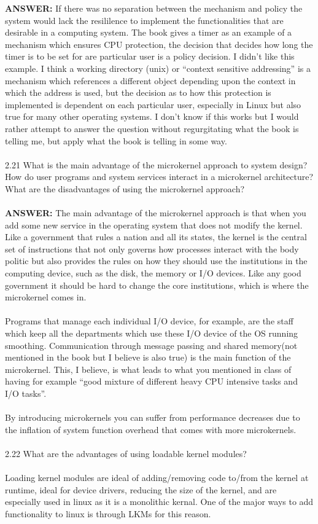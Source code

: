 \documentclass[12pt]{article}
\begin{document}
\textbf{ANSWER: }If there was no separation between the mechanism 
and policy the system would lack the resililence to implement the 
functionalities that are desirable in a computing system. The book 
gives a timer as an example of a mechanism which ensures CPU 
protection, the decision that decides how long the timer is 
to be set for are particular user is a policy decision. I didn't 
like this example. I think a working directory (unix) or ``context 
sensitive addressing'' is a mechanism which references a 
different object depending upon the context in which the 
address is used, but the decision as to how this protection 
is implemented is dependent on each particular user, especially in 
Linux but also true for many other operating systems. I don't know 
if this works but I would rather attempt to answer the question without 
regurgitating what the book is telling me, but apply what the 
book is telling in some way.
\\\\2.21 What is the main advantage of the microkernel approach to system
design? How do user programs and system services interact in a
microkernel architecture? What are the disadvantages of using the
microkernel approach?\\\\
\textbf{ANSWER: }The main advantage of the microkernel approach 
is that when you add some new service in the operating system that 
does not modify the kernel. Like a government that rules a nation 
and all its states, the kernel is the central set of instructions 
that not only governs how processes interact with the body politic 
but also provides the rules on how they should use the institutions 
in the computing device, such as the disk, the memory or I/O devices.
Like any good government it should be hard to change the core 
institutions, which is where the microkernel comes in.\\\\
Programs that manage each individual I/O device, for example, 
are the staff which keep all the departments which use these I/O 
device of the OS running smoothing. Communication through message 
passing and shared memory(not mentioned in the book but I believe 
is also true) is the main function of the microkernel. This, I believe, 
is what leads to what you mentioned in class of having for example
 ``good mixture of different heavy CPU intensive tasks 
and I/O tasks''.\\\\
By introducing microkernels you can suffer from performance decreases 
due to the inflation of system function overhead that comes with 
more microkernels.\\\\
2.22 What are the advantages of using loadable kernel modules?\\\\
Loading kernel modules are ideal of adding/removing code to/from 
the kernel at runtime, ideal for device drivers, reducing the size of 
the kernel, and are especially used in linux as it is a monolithic kernal.
One of the major ways to add functionality to linux is through LKMs for 
this reason.
\end{document}
